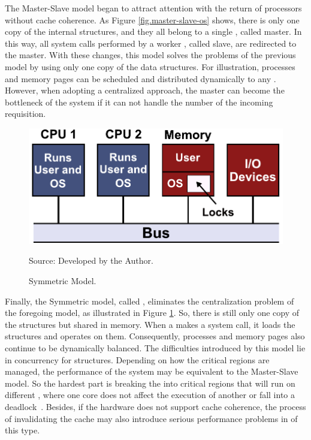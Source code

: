 			The Master-Slave model began to attract attention with the return of
			processors without cache coherence.
			As Figure \ref{fig.master-slave-os} shows, there is only one copy of
			the internal \os structures, and they all belong to a single \cpu, called master.
			In this way, all system calls performed by a worker \cpu, called slave,
			are redirected to the master.
			With these changes, this model solves the problems of the previous model
			by using only one copy of the data structures.
			For illustration, processes and memory pages can be scheduled and
			distributed dynamically to any \cpus.
			However, when adopting a centralized approach, the master can become
			the bottleneck of the system if it can not handle the number of the
			incoming requisition.

			\begin{figure}[h]
				\centering
				\caption{Symmetric \os Model.}

				\includegraphics[width=.7\textwidth]{images/symmetric-os.pdf}

				Source: Developed by the Author.

				\label{fig.smp-os}
			\end{figure}

			Finally, the Symmetric model, called \smp, eliminates the centralization
			problem of the foregoing model, as illustrated in Figure \ref{fig.smp-os}.
			So, there is still only one copy of the \os structures but shared in memory.
			When a \cpu makes a system call, it loads the structures and operates on them.
			Consequently, processes and memory pages also continue to be dynamically balanced.
			The difficulties introduced by this model lie in concurrency for \os structures.
			Depending on how the critical regions are managed, the performance of the system
			may be equivalent to the Master-Slave model. So the hardest part is breaking the
			\os into critical regions that will run on different \cpus, where one core does
			not affect the execution of another or fall into a deadlock~\cite{tanenbaum:4ed}.
			Besides, if the hardware does not support cache coherence, the process of
			invalidating the cache may also introduce serious performance problems in \oses of this type.

